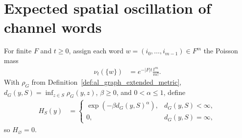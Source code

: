 \section{Expected spatial oscillation of channel words}
\label{sec:al_channel_poisson_growth}

For finite $F$ and $t\ge0$, assign each word $w=(i_0,\ldots,i_{m-1})\in F^m$
the Poisson mass
\begin{align}
    \label{eq:al_poisson_word_mass}
    \nu_t(\{w\}) & =e^{-|F|t}\frac{t^m}{m!}.
\end{align}
With $\rho_G$ from Definition~\ref{def:al_graph_extended_metric},
$d_G(y,S)=\inf_{z\in S}\rho_G(y,z)$, $\beta\ge0$, and $0<\alpha\le1$, define
\begin{align}
    \label{eq:al_poisson_distance_profile}
    H_S(y) & =
    \left\{\begin{array}{ll}
               \exp(-\beta d_G(y,S)^\alpha), & d_G(y,S)<\infty, \\
               0,                            & d_G(y,S)=\infty,
           \end{array}\right.
\end{align}
so $H_{\varnothing}=0$.

